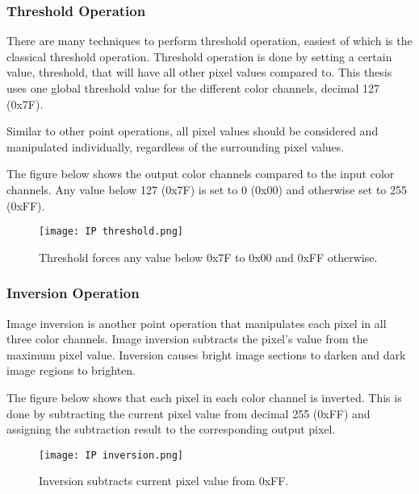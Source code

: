 \subsubsection{Threshold Operation}
\par There are many techniques to perform threshold operation, easiest of which is the classical threshold operation. Threshold operation is done by setting a certain value, threshold, that will have all other pixel values compared to. This thesis uses one global threshold value for the different color channels, decimal 127 (0x7F). \newline
\par Similar to other point operations, all pixel values should be considered and manipulated individually, regardless of the surrounding pixel values. \newline
\par The figure below shows the output color channels compared to the input color channels. Any value below 127 (0x7F) is set to 0 (0x00) and otherwise set to 255 (0xFF). \newline

\begin{figure}[H]
	\centering
	\texttt{[image: IP threshold.png]}
	\caption{Threshold forces any value below 0x7F to 0x00 and 0xFF otherwise.}
	\label{fig:ipthreshold}  
\end{figure}

\subsubsection{Inversion Operation}
\par Image inversion is another point operation that manipulates each pixel in all three color channels. Image inversion subtracts the pixel's value from the maximum pixel value. Inversion causes bright image sections to darken and dark image regions to brighten. \newline
\par The figure below shows that each pixel in each color channel is inverted. This is done by subtracting the current pixel value from decimal 255 (0xFF) and assigning the subtraction result to the corresponding output pixel. \newline

\begin{figure}[H]
	\centering
	\texttt{[image: IP inversion.png]}
	\caption{Inversion subtracts current pixel value from 0xFF.}
	\label{fig:ipinversion}  
\end{figure}

